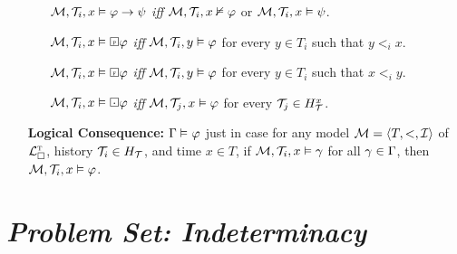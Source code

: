 \documentclass[a4paper, 11pt]{article} %
\begin{document}
\begin{enumerate}[leftmargin=1.2in]
\begin{itemize}[leftmargin=.15in]
      \item[] $\M, \T_i, x \vDash \metaA\rightarrow \metaB$ \textit{iff} $\M, \T_i, x\nvDash \metaA$ or $\M, \T_i, x \vDash  \metaB$.
      \item[] $\M, \T_i, x \vDash \Past \metaA$ \textit{iff} $\M, \T_i, y\vDash \metaA$ for every $y \in T_i$ such that $y <_i x$.
      \item[] $\M, \T_i, x \vDash \Future \metaA$ \textit{iff} $\M, \T_i, y\vDash \metaA$ for every $y \in T_i$ such that $x <_i y$.
      \item[] $\M, \T_i, x \vDash \Inevitably \metaA$ \textit{iff} $\M, \T_j, x\vDash \metaA$ for every $\T_j \in H_\T^x$.
    \end{itemize}
  \item[\bf Logical Consequence:] $\MetaG \MLmodels[] \metaA$ just in case for any model $\M = \tuple{T, <, \I}$ of $\TL_\square$, history $\T_i \in H_\T$, and time $x \in T$, if $\M, \T_i, x \vDash \metaG$ for all $\metaG \in \MetaG$, then $\M, \T_i, x \vDash \metaA$.
\end{enumerate}



\section*{\it Problem Set: Indeterminacy}
\end{document}
